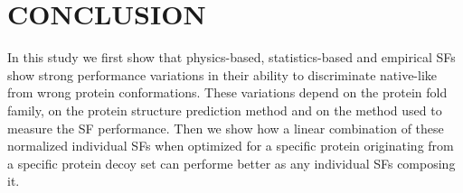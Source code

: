 \documentclass[a4paper,20pt,notitlepage,openbib]{article}
\begin{document}
\section{CONCLUSION}
In this study we first show that physics-based, statistics-based and empirical SFs show strong performance variations in their ability to discriminate native-like from wrong protein conformations. These variations depend on the protein fold family, on the protein structure prediction method and on the method used to measure the SF performance. Then we show how a linear combination of these normalized individual SFs when optimized for a specific protein originating from a specific protein decoy set can performe better as any individual SFs composing it.
%
%
%
%
\end{document}
